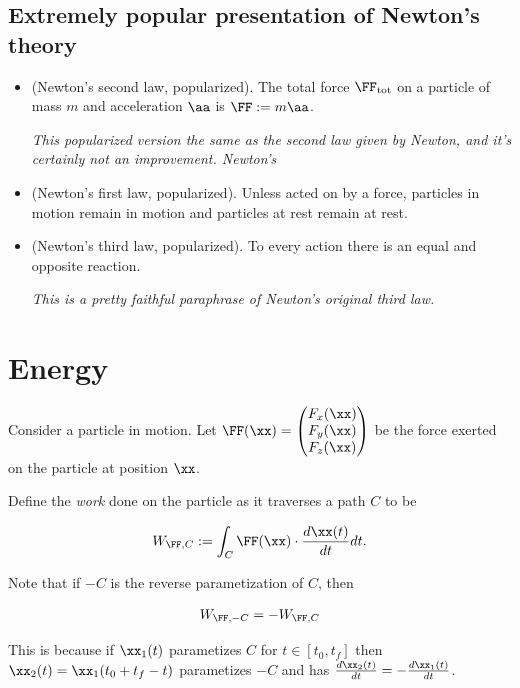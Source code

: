 \documentclass{article}
\begin{document}
\subsection*{Extremely popular presentation of Newton's theory}

\begin{itemize}
	\item (Newton's second law, popularized). The total force $\FF_{\text{tot}}$ on a particle of mass $m$ and acceleration $\aa$ is $\FF := m\aa$.
	
	\textit{This popularized version the same as the second law given by Newton, and it's certainly not an improvement. Newton's }
	
	\item (Newton's first law, popularized). Unless acted on by a force, particles in motion remain in motion and particles at rest remain at rest.
	
	
	\item (Newton's third law, popularized). To every action there is an equal and opposite reaction.
	
	\textit{This is a pretty faithful paraphrase of Newton's original third law.}
\end{itemize}

\newpage

\section*{Energy}

Consider a particle in motion. Let $\FF(\xx) = \begin{pmatrix} F_x(\xx) \\ F_y(\xx) \\ F_z(\xx) \end{pmatrix}$ be the force exerted on the particle at position $\xx$.

Define the \textit{work} done on the particle as it traverses a path $C$ to be

\begin{align*}
    W_{\FF, C} := \int_C \FF(\xx) \cdot \frac{d \xx(t)}{d t} dt.
\end{align*}

Note that if $-C$ is the reverse parametization of $C$, then

\begin{align*}
    W_{\FF, -C} = -W_{\FF, C}
\end{align*}

This is because if $\xx_1(t)$ parametizes $C$ for $t \in [t_0, t_f]$ then $\xx_2(t) = \xx_1(t_0 + t_f - t)$ parametizes $-C$ and has $\frac{d\xx_2(t)}{dt} = - \frac{d\xx_1(t)}{dt}$.
\end{document}
